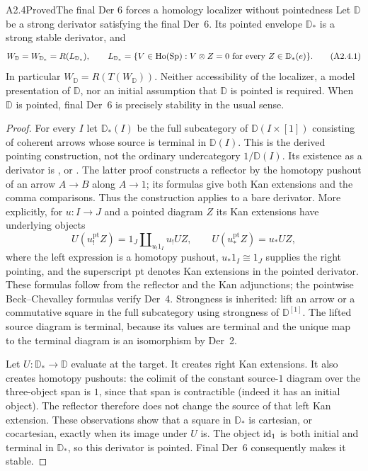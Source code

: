 \begin{claim}{A2.4}{Proved}{The final Der 6 forces a homology localizer without pointedness}
\label{A2-stable-envelope}
Let $\mathbb D$ be a strong derivator satisfying the final Der~6. Its pointed
envelope $\mathbb D_*$ is a strong stable derivator, and
\[
 W_{\mathbb D}=W_{\mathbb D_*}=R(L_{\mathbb D_*}),\qquad
 L_{\mathbb D_*}=\{V\in\mathrm{Ho}(\mathrm{Sp}):V\otimes Z=0
                              \text{ for every }Z\in\mathbb D_*(e)\}.
 \tag{A2.4.1}
\]
In particular $W_{\mathbb D}=R(T(W_{\mathbb D}))$. Neither accessibility of
the localizer, a model presentation of $\mathbb D$, nor an initial assumption
that $\mathbb D$ is pointed is required. When $\mathbb D$ is pointed, final
Der~6 is precisely stability in the usual sense.
\end{claim}
\begin{proof}
For every $I$ let $\mathbb D_*(I)$ be the full subcategory of
$\mathbb D(I\times[1])$ consisting of coherent arrows whose source is
terminal in $\mathbb D(I)$. This is the derived pointing construction, not
the ordinary undercategory $1/\mathbb D(I)$. Its existence as a derivator
is \cite[III.5, Proposition~5.1 and Lemma~5.2, pp.~41--42]{A2Heller}, or
\cite[Proposition~4.11]{A2CisinskiKan}. The latter proof constructs a
reflector by the homotopy pushout of an arrow $A\to B$ along $A\to1$;
its formulas give both Kan extensions and the comma comparisons. Thus the
construction applies to a bare derivator. More explicitly, for $u:I\to J$
and a pointed diagram $Z$ its Kan extensions have underlying objects
\[
 U(u_!^{\mathrm{pt}}Z)=1_J\amalg_{u_!1_I}u_!UZ,\qquad
 U(u_*^{\mathrm{pt}}Z)=u_*UZ,
 \tag{A2.4.1a}
\]
where the left expression is a homotopy pushout, $u_*1_I\cong1_J$ supplies
the right pointing, and the superscript $\mathrm{pt}$ denotes Kan
extensions in the pointed derivator. These formulas
follow from the reflector and the Kan adjunctions; the pointwise
Beck--Chevalley formulas verify Der~4. Strongness is inherited: lift
an arrow or a commutative square in the full subcategory using strongness
of $\mathbb D^{[1]}$. The lifted source diagram is terminal, because its
values are terminal and the unique map to the terminal diagram is an
isomorphism by Der~2.

Let $U:\mathbb D_*\to\mathbb D$ evaluate at the target. It creates right
Kan extensions. It also creates homotopy pushouts: the colimit of the
constant source-$1$ diagram over the three-object span is $1$, since that
span is contractible (indeed it has an initial object). The reflector therefore
does not change the source of that left Kan extension. These observations
show that a square in $\mathbb D_*$ is cartesian, or cocartesian, exactly
when its image under $U$ is. The object $\operatorname{id}_1$ is both initial and terminal
in $\mathbb D_*$, so this derivator is pointed. Final Der~6 consequently
makes it stable.


\end{proof}
